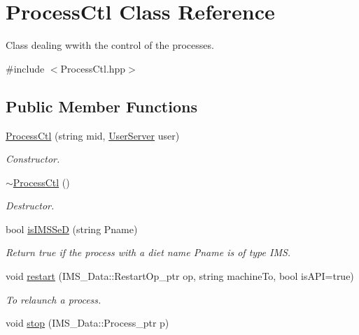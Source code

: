 \hypertarget{classProcessCtl}{
\section{ProcessCtl Class Reference}
\label{classProcessCtl}
}


Class dealing wwith the control of the processes.  




{\ttfamily \#include $<$ProcessCtl.hpp$>$}

\subsection*{Public Member Functions}
\begin{DoxyCompactItemize}
\item 
\hypertarget{classProcessCtl_aad750ba43012df28a30e324c84097f71}{
\hyperlink{classProcessCtl_aad750ba43012df28a30e324c84097f71}{ProcessCtl} (string mid, \hyperlink{classUserServer}{UserServer} user)}
\label{classProcessCtl_aad750ba43012df28a30e324c84097f71}

\begin{DoxyCompactList}\small\item\em Constructor. \item\end{DoxyCompactList}\item 
\hypertarget{classProcessCtl_ad629603a361c699594214d5c662f9f43}{
\hyperlink{classProcessCtl_ad629603a361c699594214d5c662f9f43}{$\sim$ProcessCtl} ()}
\label{classProcessCtl_ad629603a361c699594214d5c662f9f43}

\begin{DoxyCompactList}\small\item\em Destructor. \item\end{DoxyCompactList}\item 
bool \hyperlink{classProcessCtl_a38209177f745d65ea63f843cd1cc2ad8}{isIMSSeD} (string Pname)
\begin{DoxyCompactList}\small\item\em Return true if the process with a diet name Pname is of type IMS. \item\end{DoxyCompactList}\item 
void \hyperlink{classProcessCtl_a7dbb1bba78af73d111d81d6f109bbd1a}{restart} (IMS\_\-Data::RestartOp\_\-ptr op, string machineTo, bool isAPI=true)
\begin{DoxyCompactList}\small\item\em To relaunch a process. \item\end{DoxyCompactList}\item 
\hypertarget{classProcessCtl_af5039d933ad14281c74969a8c1315023}{
void \hyperlink{classProcessCtl_af5039d933ad14281c74969a8c1315023}{stop} (IMS\_\-Data::Process\_\-ptr p)}
\label{classProcessCtl_af5039d933ad14281c74969a8c1315023}


\end{DoxyCompactItemize}
